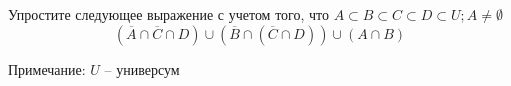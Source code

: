 \question
Упростите следующее выражение с учетом того, что $A\subset B \subset C \subset D \subset U; A \neq \emptyset$
\begin{equation*}
	(\overline{A} \cap \overline{C} \cap D) \cup (\overline{B} \cap (\overline{C} \cap D))\cup( A \cap B)
\end{equation*}

Примечание: $U$ -- универсум
